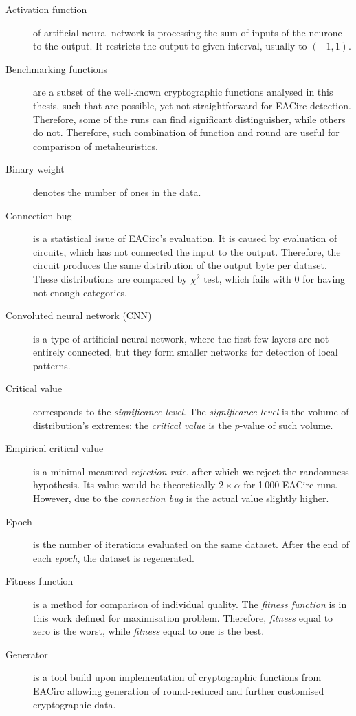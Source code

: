 \documentclass[
    digital,    %
    oneside,    %
    color,
    11pt,
    nocover,
    notable,
    nolof,
    nolot,
]{fithesis3}
\begin{document}
\begin{description}
    \item[Activation function] of artificial neural network is processing the sum of inputs of the neurone to the output. It restricts the output to given interval, usually to $(-1, 1)$.
    \item[Benchmarking functions] are a subset of the well-known cryptographic functions analysed in this thesis, such that are possible, yet not straightforward for EACirc detection. Therefore, some of the runs can find significant distinguisher, while others do not. Therefore, such combination of function and round are useful for comparison of metaheuristics.
    \item[Binary weight] denotes the number of ones in the data.
    \item[Connection bug] is a statistical issue of EACirc's evaluation. It is caused by evaluation of circuits, which has not connected the input to the output. Therefore, the circuit produces the same distribution of the output byte per dataset. These distributions are compared by $\chi^{2}$ test, which fails with 0 for having not enough categories.
    \item[Convoluted neural network (CNN)] is a type of artificial neural network, where the first few layers are not entirely connected, but they form smaller networks for detection of local patterns.
    \item[Critical value] corresponds to the \textit{significance level}. The \textit{significance level} is the volume of distribution's extremes; the \textit{critical value} is the $p$-value of such volume.
    \item[Empirical critical value] is a minimal measured \textit{rejection rate}, after which we reject the randomness hypothesis. Its value would be theoretically $2\times \alpha$ for 1\,000 EACirc runs. However, due to the \textit{connection bug} is the actual value slightly higher.
    \item[Epoch] is the number of iterations evaluated on the same dataset. After the end of each \textit{epoch}, the dataset is regenerated.
    \item[Fitness function] is a method for comparison of individual quality. The \textit{fitness function} is in this work defined for maximisation problem. Therefore, \textit{fitness} equal to zero is the worst, while \textit{fitness} equal to one is the best.
    \item[Generator] is a tool build upon implementation of cryptographic functions from EACirc allowing generation of round-reduced and further customised cryptographic data.

\end{description}
\end{document}
